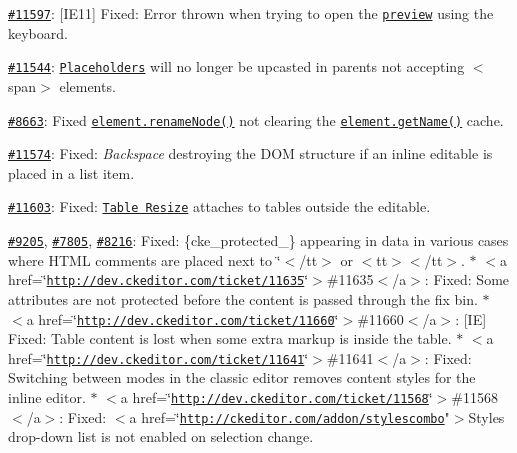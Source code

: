 \begin{DoxyItemize}
\item \href{http://dev.ckeditor.com/ticket/11597}{\tt \#11597}\+: \mbox{[}I\+E11\mbox{]} Fixed\+: Error thrown when trying to open the \href{http://ckeditor.com/addon/preview}{\tt preview} using the keyboard.
\item \href{http://dev.ckeditor.com/ticket/11544}{\tt \#11544}\+: \href{http://ckeditor.com/addon/placeholder}{\tt Placeholders} will no longer be upcasted in parents not accepting {\ttfamily $<$span$>$} elements.
\item \href{http://dev.ckeditor.com/ticket/8663}{\tt \#8663}\+: Fixed \href{http://docs.ckeditor.com/#!/api/CKEDITOR.dom.element-method-renameNode}{\tt {\ttfamily element.\+rename\+Node()}} not clearing the \href{http://docs.ckeditor.com/#!/api/CKEDITOR.dom.element-method-getName}{\tt {\ttfamily element.\+get\+Name()}} cache.
\item \href{http://dev.ckeditor.com/ticket/11574}{\tt \#11574}\+: Fixed\+: {\itshape Backspace} destroying the D\+OM structure if an inline editable is placed in a list item.
\item \href{http://dev.ckeditor.com/ticket/11603}{\tt \#11603}\+: Fixed\+: \href{http://ckeditor.com/addon/tableresize}{\tt Table Resize} attaches to tables outside the editable.
\item \href{http://dev.ckeditor.com/ticket/9205}{\tt \#9205}, \href{http://dev.ckeditor.com/ticket/7805}{\tt \#7805}, \href{http://dev.ckeditor.com/ticket/8216}{\tt \#8216}\+: Fixed\+: {\ttfamily \{cke\+\_\+protected\+\_\}} appearing in data in various cases where H\+T\+ML comments are placed next to {\ttfamily \char`\"{}$<$/tt$>$ or $<$tt$>$\textquotesingle{}$<$/tt$>$.
$\ast$ $<$a href=\char`\"{}\href{http://dev.ckeditor.com/ticket/11635}{\tt http\+://dev.\+ckeditor.\+com/ticket/11635}\char`\"{}$>$\#11635$<$/a$>$\+: Fixed\+: Some attributes are not protected before the content is passed through the fix bin.
$\ast$ $<$a href=\char`\"{}\href{http://dev.ckeditor.com/ticket/11660}{\tt http\+://dev.\+ckeditor.\+com/ticket/11660}\char`\"{}$>$\#11660$<$/a$>$\+: \mbox{[}\+I\+E\mbox{]} Fixed\+: Table content is lost when some extra markup is inside the table.
$\ast$ $<$a href=\char`\"{}\href{http://dev.ckeditor.com/ticket/11641}{\tt http\+://dev.\+ckeditor.\+com/ticket/11641}\char`\"{}$>$\#11641$<$/a$>$\+: Fixed\+: Switching between modes in the classic editor removes content styles for the inline editor.
$\ast$ $<$a href=\char`\"{}\href{http://dev.ckeditor.com/ticket/11568}{\tt http\+://dev.\+ckeditor.\+com/ticket/11568}\char`\"{}$>$\#11568$<$/a$>$\+: Fixed\+: $<$a href=\char`\"{}\href{http://ckeditor.com/addon/stylescombo}{\tt http\+://ckeditor.\+com/addon/stylescombo}"$>$Styles drop-\/down list is not enabled on selection change.}
\end{DoxyItemize}

